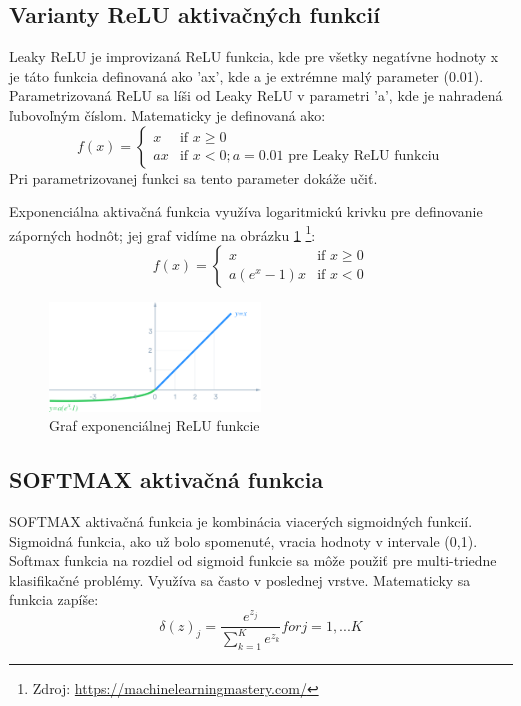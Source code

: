 \subsection{Varianty ReLU aktivačných  funkcií}
Leaky ReLU je improvizaná ReLU funkcia, kde pre všetky negatívne hodnoty x je táto funkcia definovaná ako 'ax', kde a je extrémne malý parameter (0.01). Parametrizovaná ReLU sa líši od Leaky ReLU v parametri 'a', kde je nahradená ľubovoľným číslom.  Matematicky je definovaná ako:
$$f(x) =
\left\{
	\begin{array}{ll}
		x  & \mbox{if } x \geq 0 \\
		ax & \mbox{if } x < 0 ; a = 0.01 \text{ pre Leaky ReLU funkciu} 
	\end{array}
\right.$$ 
Pri parametrizovanej funkci sa tento parameter dokáže učiť.\par
Exponenciálna aktivačná funkcia využíva logaritmickú krivku pre definovanie záporných hodnôt; jej graf vidíme na obrázku \ref{erelu} \footnote{Zdroj: \url{https://machinelearningmastery.com/}}:
$$f(x) =
\left\{
	\begin{array}{ll}
		x  & \mbox{if } x \geq 0 \\
		a(e^x-1)x & \mbox{if } x < 0 
	\end{array}
\right.$$  \cite{sharma}
 \begin{figure}[!ht]
 \centering
 \includegraphics[width=0.5\textwidth]{obrazky-figures/e_relu.png}
\caption{Graf exponenciálnej ReLU funkcie }

\label{erelu}
\end{figure}
\subsection{SOFTMAX aktivačná funkcia}
SOFTMAX aktivačná funkcia je kombinácia viacerých sigmoidných funkcií. Sigmoidná funkcia, ako už bolo spomenuté, vracia hodnoty v intervale (0,1). Softmax funkcia na rozdiel od sigmoid funkcie sa môže použiť pre multi-triedne klasifikačné problémy. Využíva sa často v poslednej vrstve. Matematicky sa funkcia zapíše:
$$\delta(z)_j = \frac{e^{z_j}}{\sum_{k=1}^{K}e^{z_k}} for j=1,...K$$ \cite{sharma}

